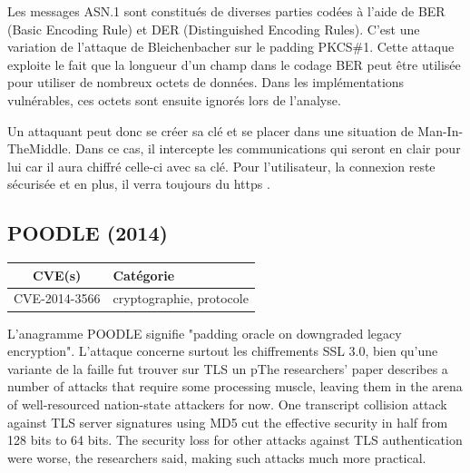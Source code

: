 Les messages ASN.1 sont constitués de diverses parties codées à l'aide de BER (Basic Encoding Rule) et DER (Distinguished Encoding Rules). C'est une variation de l'attaque de Bleichenbacher sur le padding PKCS\#1. Cette attaque exploite le fait que la longueur d'un champ dans le codage BER peut être utilisée pour utiliser de nombreux octets de données. Dans les implémentations vulnérables, ces octets sont ensuite ignorés lors de l'analyse.

Un attaquant peut donc se créer sa clé et se placer dans une situation de Man-In-TheMiddle. Dans ce cas, il intercepte les communications qui seront en clair pour lui car il aura chiffré celle-ci avec sa clé. Pour l'utilisateur, la connexion reste sécurisée et en plus, il verra toujours du https \cite{berserk}.




\subsection{POODLE (2014)}

\begin{tabularx}{0.96\textwidth}{|c|X|}
  \hline
  \textbf{CVE(s)} & \textbf{Catégorie} \\
  \hline
  CVE-2014-3566 & cryptographie, protocole \\
  \hline
\end{tabularx}

\vspace{1em}

L'anagramme POODLE signifie "padding oracle on downgraded legacy encryption". L'attaque concerne surtout les chiffrements SSL 3.0, bien qu'une variante de la faille fut trouver sur TLS un pThe researchers’ paper describes a number of attacks that require some processing muscle, leaving them in the arena of well-resourced nation-state attackers for now. One transcript collision attack against TLS server signatures using MD5 cut the effective security in half from 128 bits to 64 bits. The security loss for other attacks against TLS authentication were worse, the researchers said, making such attacks much more practical.

